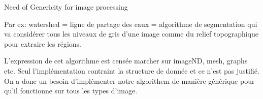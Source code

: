 \documentclass[12pt,aspectratio=169]{beamer}
\begin{document}
\begin{frame}[fragile]{Need of Genericity for image processing}
{    Par ex: watershed = ligne de partage des eaux = algorithme de segmentation qui va considérer tous les niveaux de gris d'une image comme du relief topographique pour extraire les régions.

    L'expression de cet algorithme est censée marcher sur imageND, mesh, graphs etc.
    Seul l'implémentation contraint la structure de donnée et ce n'est pas justifié.
    On a donc un besoin d'implémenter notre algorithem de manière générique pour qu'il fonctionne sur tous les types d'image.
  }
\end{frame}

\end{document}
